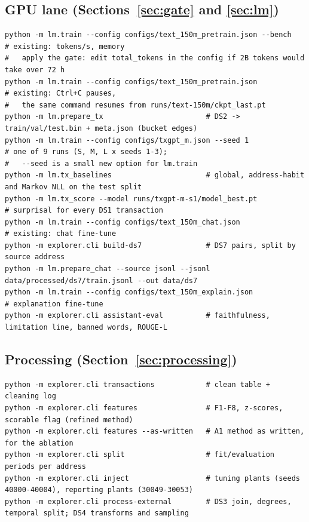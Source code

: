 \subsection{GPU lane (Sections~\ref{sec:gate} and \ref{sec:lm})}

\begin{lstlisting}
python -m lm.train --config configs/text_150m_pretrain.json --bench   # existing: tokens/s, memory
#   apply the gate: edit total_tokens in the config if 2B tokens would take over 72 h
python -m lm.train --config configs/text_150m_pretrain.json           # existing: Ctrl+C pauses,
#   the same command resumes from runs/text-150m/ckpt_last.pt
python -m lm.prepare_tx                        # DS2 -> train/val/test.bin + meta.json (bucket edges)
python -m lm.train --config configs/txgpt_m.json --seed 1             # one of 9 runs (S, M, L x seeds 1-3);
#   --seed is a small new option for lm.train
python -m lm.tx_baselines                      # global, address-habit and Markov NLL on the test split
python -m lm.tx_score --model runs/txgpt-m-s1/model_best.pt           # surprisal for every DS1 transaction
python -m lm.train --config configs/text_150m_chat.json               # existing: chat fine-tune
python -m explorer.cli build-ds7               # DS7 pairs, split by source address
python -m lm.prepare_chat --source jsonl --jsonl data/processed/ds7/train.jsonl --out data/ds7
python -m lm.train --config configs/text_150m_explain.json            # explanation fine-tune
python -m explorer.cli assistant-eval          # faithfulness, limitation line, banned words, ROUGE-L
\end{lstlisting}

\subsection{Processing (Section~\ref{sec:processing})}

\begin{lstlisting}
python -m explorer.cli transactions            # clean table + cleaning log
python -m explorer.cli features                # F1-F8, z-scores, scorable flag (refined method)
python -m explorer.cli features --as-written   # A1 method as written, for the ablation
python -m explorer.cli split                   # fit/evaluation periods per address
python -m explorer.cli inject                  # tuning plants (seeds 40000-40004), reporting plants (30049-30053)
python -m explorer.cli process-external        # DS3 join, degrees, temporal split; DS4 transforms and sampling
\end{lstlisting}

